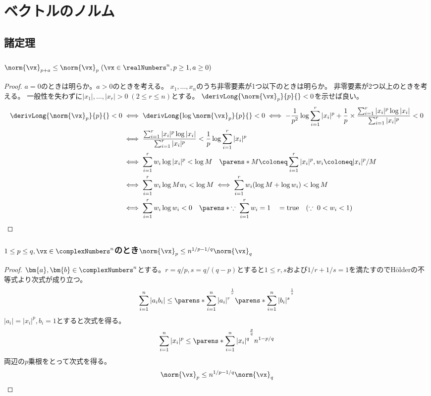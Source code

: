 \chapter{ベクトルのノルム}
    \section{諸定理}
        \subsection{\texorpdfstring{$\norm{\vx}_{p+a} \leq \norm{\vx}_p\;(\vx\in\realNumbers^n,p\geq 1,a\geq 0)$}{||x||\_\{p+a\} ≤ ||x||\_p (x∈R\string^n, p≥1, a≥0)}}
            \begin{proof}
                $a=0$のときは明らか。$a>0$のときを考える。
                $x_1,\dotsc,x_n$のうち非零要素が1つ以下のときは明らか。
                非零要素が2つ以上のときを考える。
                一般性を失わずに$|x_1|,\dotsc,|x_r|>0\;(2\leq r\leq n)$とする。
                $\derivLong{\norm{\vx}_p}{p}{} < 0$を示せば良い。
                \begin{align*}
                    \derivLong{\norm{\vx}_p}{p}{} < 0 &\iff \derivLong{\log \norm{\vx}_p}{p}{} < 0 \iff -\frac{1}{p^2}\log \sum_{i=1}^r |x_i|^p + \frac{1}{p}\times\frac{\sum_{i=1}^r |x_i|^p\log |x_i|}{\sum_{i=1}^r |x_i|^p} < 0 \\
                    &\iff \frac{\sum_{i=1}^r |x_i|^p\log |x_i|}{\sum_{i=1}^r |x_i|^p} < \frac{1}{p}\log \sum_{i=1}^r |x_i|^p \\
                    &\iff \sum_{i=1}^r w_i\log |x_i|^p < \log M \quad \parens*{ M \coloneq \sum_{i=1}^r |x_i|^p, w_i \coloneq |x_i|^p/M } \\
                    &\iff \sum_{i=1}^r w_i\log M w_i < \log M \iff \sum_{i=1}^r w_i(\log M + \log w_i) < \log M \\
                    &\iff \sum_{i=1}^r w_i\log w_i < 0 \quad \parens*{ \because\;\sum_{i=1}^r w_i = 1 } \quad = \text{true} \quad (\because\; 0<w_i<1)
                \end{align*}
            \end{proof}
        \subsection{\texorpdfstring{$1\leq p\leq q,\vx\in\complexNumbers^n$}{1≤p≤q, x∈C\string^n}のとき\texorpdfstring{$\norm{\vx}_p \leq n^{1/p-1/q}\norm{\vx}_q$}{||x||\_p ≤ n\string^(1/p-1/q)||x||\_q}}
            \begin{proof}
                $\bm{a},\bm{b}\in\complexNumbers^n$とする。$r=q/p, s=q/(q-p)$とすると$1\leq r,s$および$1/r+1/s=1$を満たすのでH\"olderの不等式より次式が成り立つ。
                \[ \sum_{i=1}^n|a_ib_i| \leq \parens*{\sum_{i=1}^n|a_i|^r}^\frac{1}{r}\parens*{\sum_{i=1}^n|b_i|^s}^\frac{1}{s} \]
                $|a_i| = |x_i|^p,b_i=1$とすると次式を得る。
                \[ \sum_{i=1}^n|x_i|^p \leq \parens*{\sum_{i=1}^n|x_i|^q}^\frac{p}{q}n^{1-p/q} \]
                両辺の$p$乗根をとって次式を得る。
                \[ \norm{\vx}_p \leq n^{1/p-1/q}\norm{\vx}_q \]
            \end{proof}
